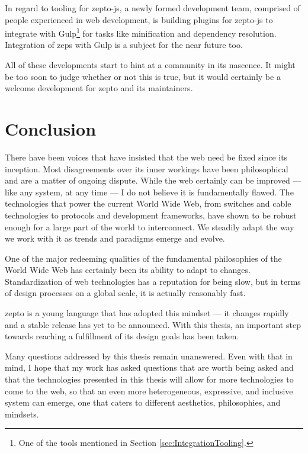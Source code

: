 \documentclass[oneside,11pt,xetex]{scrbook}
\begin{document}
In regard to tooling for zepto-js, a newly formed development team, comprised of
people experienced in web development, is building plugins for zepto-js to integrate
with Gulp\footnote{One of the tools mentioned in Section \ref{sec:IntegrationTooling}.} for
tasks like minification and dependency resolution. Integration of \gls{zeps} with
Gulp is a subject for the near future too.

All of these developments start to hint at a community in its nascence. It might
be too soon to judge whether or not this is true, but it would certainly be a welcome
development for zepto and its maintainers.

\chapter{Conclusion}
\label{chap:conclusion}

There have been voices that have insisted that the web need be fixed
since its inception. Most disagreements over its inner workings
have been philosophical and are a matter of ongoing dispute.
While the web certainly can be improved --- like any system,
at any time --- I do not believe it is fundamentally flawed. The
technologies that power the current World Wide Web, from switches
and cable technologies to protocols and development frameworks,
have shown to be robust enough for a large part of the world
to interconnect. We steadily adapt the way we work with it
as trends and paradigms emerge and evolve.

One of the major redeeming qualities of the fundamental
philosophies of the World Wide Web has certainly been
its ability to adapt to changes. Standardization of web
technologies has a reputation for being slow, but in terms
of design processes on a global scale, it is actually reasonably
fast.

zepto is a young language that has adopted this mindset ---
it changes rapidly and a stable release has yet to be announced.
With this thesis, an important step towards reaching a fulfillment
of its design goals has been taken.

Many questions addressed by this thesis remain unanswered.
Even with that in mind, I hope that my work has asked
questions that are worth being asked and that the technologies
presented in this thesis will allow for more technologies to
come to the web, so that an even more heterogeneous,
expressive, and inclusive system can emerge, one that
caters to different aesthetics, philosophies, and mindsets.
\end{document}
